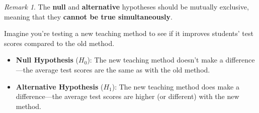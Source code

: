\documentclass[math,code]{amznotes}
\theoremstyle{remark}
\newtheorem*{remark}{Remark}
\begin{document}
\begin{notebox}
    \begin{remark}
        The \textbf{null} and \textbf{alternative} hypotheses should be mutually exclusive, meaning that they \textbf{cannot be true simultaneously}.
    \end{remark}
\end{notebox}
Imagine you’re testing a new teaching method to see if it improves students’ test scores compared to the old method.
\begin{itemize}
    \item \textbf{Null Hypothesis} ($H_0$): The new teaching method doesn’t make a difference—the average test scores are the same as with the old method.
    \item \textbf{Alternative Hypothesis} ($H_1$): The new teaching method does make a difference—the average test scores are higher (or different) with the new method.
\end{itemize}
\end{document}

